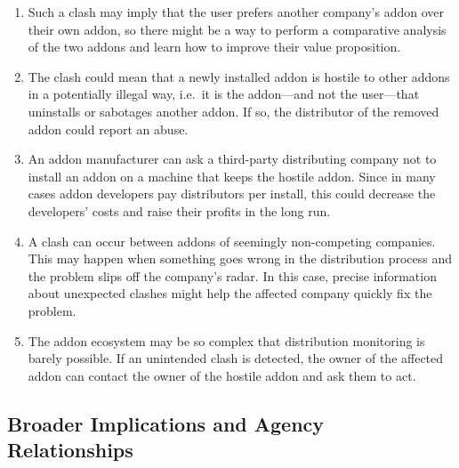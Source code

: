 \documentclass[10pt,letterpaper]{article}
\begin{document}
\begin{enumerate}
\item  Such a clash may imply that the user prefers another company's addon over their own addon, so there might be a way to perform a comparative analysis of the two addons and learn how to improve their value proposition. 

\item  The clash could mean that a newly installed addon is hostile to other addons in a potentially illegal way, i.e.~it is the addon---and not the user---that uninstalls or sabotages another addon. If so, the distributor of the removed addon could report an abuse. 

\item  An addon manufacturer can ask a third-party distributing company not to install an addon on a machine that keeps the hostile addon. Since in many cases addon developers pay distributors per install, this could decrease the developers' costs and raise their profits in the long run. 

\item  A clash can occur between addons of seemingly non-competing companies. This may happen when something goes wrong in the distribution process and the problem slips off the company's radar. In this case, precise information about unexpected clashes might help the affected company quickly fix the problem.

\item  The addon ecosystem may be so complex that distribution monitoring is barely possible. If an unintended clash is detected, the owner of the affected addon can contact the owner of the hostile addon and ask them to act. 
\end{enumerate}

\subsection*{Broader Implications and Agency Relationships}
\end{document}
